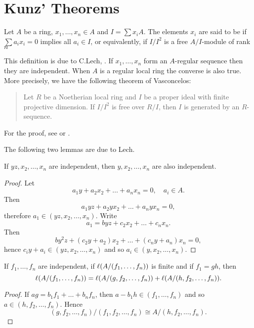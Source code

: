 \documentclass[../main]{subfiles}
\begin{document}
\section{Kunz' Theorems}\label{sec:42}

\newparagraph Let $A$ be a ring, $x_1, \ldots, x_n \in A$ and $I=\sum x_i A$. The elements $x_i$ are said to be  if $\sum a_i x_i=0$ implies all $a_i \in I$, or equivalently, if $I / I^2$ is a free $A/I$-module of rank $n$

This definition is due to C.Lech, \cite{lech1964inequalities}. If $x_1, \ldots, x_n$ form an $A$-regular sequence then they are independent. When $A$ is a regular local ring the converse is also true. More precisely, we have the following theorem of Vasconcelos:
\begin{quote}
    Let $R$ be a Noetherian local ring and $I$ be a proper ideal with finite projective dimension. If $I/I^2$ is free over $R / I$, then $I$ is generated by an $R$-sequence.
\end{quote}
For the proof, see \cite{vasconcelos1967ideal} or \cite[Th. 199]{kaplansky1970commutative}.

The following two lemmas are due to Lech.

\begin{lemma}\label{lem:42.01}
If $y z, x_2, \ldots, x_n$ are independent, then $y, x_2, \ldots, x_n$ are also independent.
\end{lemma}

\begin{proof}
Let \[a_1 y+a_2 x_2+\ldots+a_n x_n=0, \quad a_i \in A.\] Then \[a_1 y z+a_2 y x_2+\ldots+a_n y x_n=0,\] therefore $a_1 \in(y z, x_2, \ldots, x_n)$. Write \[a_1=b y z+c_2 x_2+\ldots+c_n x_n.\] Then \[b y^2 z+(c_2 y+a_2) x_2+\ldots+(c_n y+a_n) x_n=0,\] hence $c_i y+a_i \in(y z, x_2, \ldots, x_n)$ and so $a_i \in(y, x_2, \ldots, x_n)$.
\end{proof} 

\begin{lemma}\label{lem:42.02}
If $f_1, \ldots, f_n$ are independent, if $\ell(A /(f_1, \dots, f_n))$ is finite and if $f_1=gh$, then \[\ell(A /(f_1, \dots, f_n))=\ell(A/(g, f_2, \dots, f_n))+\ell(A /(h, f_2, \dots, f_n)).\]
\end{lemma}

\begin{proof}
If $a g=b_1 f_1+\ldots+b_n f_n$, then $a-b_1 h \in(f_1, \ldots, f_n)$ and so \newline $a \in(h, f_2, \ldots, f_n)$. Hence \[(g, f_2, \ldots, f_n) /(f_1, f_2, \ldots, f_n) \cong A /(h, f_2, \ldots, f_n).\]
\end{proof}
\end{document}
